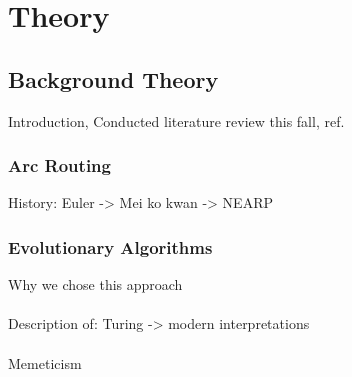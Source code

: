 \chapter{Theory}

\section{Background Theory}
Introduction, Conducted literature review this fall, ref.

\subsection{Arc Routing}
History:
Euler -> Mei ko kwan -> NEARP

\subsection{Evolutionary Algorithms}
Why we chose this approach
\\\\
Description of:
Turing -> modern interpretations
\\\\
Memeticism

\cleardoublepage